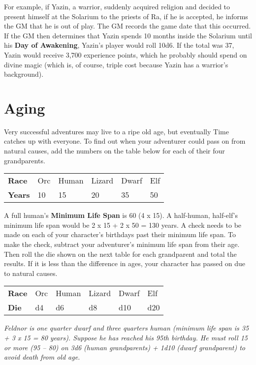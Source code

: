 \begin{multicols*}{2}
For example, if Yazin, a warrior, suddenly acquired religion and decided to present himself at the Solarium to the priests of Ra, if he is accepted, he informs the GM that he is out of play. The GM records the game date that this occurred. If the GM then determines that Yazin spends 10 months inside the Solarium until his \textbf{Day of Awakening}, Yazin's player would roll 10d6. If the total was 37, Yazin would receive 3,700 experience points, which he probably should spend on divine magic (which is, of course, triple cost because Yazin has a warrior's background).
\section{Aging}
Very successful adventures may live to a ripe old age, but eventually Time catches up with everyone. To find out when your adventurer could pass on from natural causes,
add the numbers on the table below for each of their four grandparents.

\begin{normbox}
\begin{tabular}{@{}l l l l l l}
\textbf{Race} & Orc & Human & Lizard & Dwarf & Elf\\
\textbf{Years} & 10 & 15 & 20 & 35 & 50\\
\end{tabular}
\end{normbox}

A full human's \textbf{Minimum Life Span} is 60 (4 x 15). A half-human, half-elf's minimum life span would be 2 x 15 + 2 x 50 = 130 years. A check needs to be made on each of your character's birthdays past their minimum life span. To make the check, subtract your adventurer's minimum life span from their age. Then roll the die shown on the next table for each grandparent and total the results. If it is less than the difference in ages, your character has passed on due to natural causes.
\begin{normbox}
\begin{tabular}{@{}l l l l l l}
\textbf{Race} & Orc & Human & Lizard & Dwarf & Elf\\
\textbf{Die} & d4 & d6 & d8 & d10 & d20\\
\end{tabular}
\end{normbox}

\textit{Feldnor is one quarter dwarf and three quarters human (minimum life span is 35 + 3 x 15 = 80 years). Suppose he has reached his 95th birthday. He must roll 15 or more (95 – 80) on 3d6 (human grandparents) + 1d10 (dwarf grandparent) to avoid death from old age.}


\end{multicols*}
